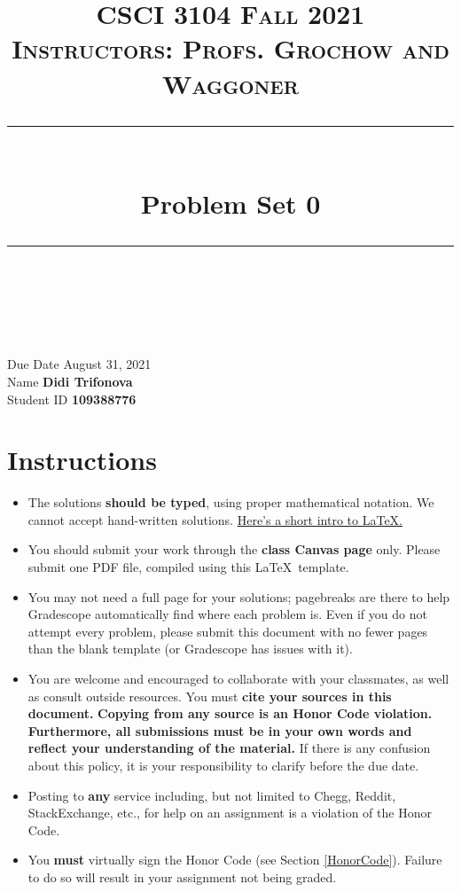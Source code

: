 \documentclass[11pt]{article}
\title{
\normalfont \normalsize 
\textsc{CSCI 3104 Fall 2021 \\ 
Instructors: Profs. Grochow and Waggoner} \\
[10pt] 
\rule{\linewidth}{0.5pt} \\[6pt] 
\huge Problem Set 0 \\
\rule{\linewidth}{2pt}  \\[10pt]
}
\date{}
\theoremstyle{definition}
\theoremstyle{definition}
\theoremstyle{definition}
\begin{document}
\maketitle


\noindent
Due Date \dotfill August 31, 2021 \\
Name \dotfill \textbf{Didi Trifonova} \\
Student ID \dotfill \textbf{109388776} 

\tableofcontents

\section{Instructions}
 \begin{itemize}
	\item The solutions \textbf{should be typed}, using proper mathematical notation. We cannot accept hand-written solutions. \href{http://ece.uprm.edu/~caceros/latex/introduction.pdf}{Here's a short intro to \LaTeX.}
	\item You should submit your work through the \textbf{class Canvas page} only. Please submit one PDF file, compiled using this \LaTeX \ template.
	\item You may not need a full page for your solutions; pagebreaks are there to help Gradescope automatically find where each problem is. Even if you do not attempt every problem, please submit this document with no fewer pages than the blank template (or Gradescope has issues with it).

	\item You are welcome and encouraged to collaborate with your classmates, as well as consult outside resources. You must \textbf{cite your sources in this document.} \textbf{Copying from any source is an Honor Code violation. Furthermore, all submissions must be in your own words and reflect your understanding of the material.} If there is any confusion about this policy, it is your responsibility to clarify before the due date. 

	\item Posting to \textbf{any} service including, but not limited to Chegg, Reddit, StackExchange, etc., for help on an assignment is a violation of the Honor Code.

	\item You \textbf{must} virtually sign the Honor Code (see Section \ref{HonorCode}). Failure to do so will result in your assignment not being graded.
\end{itemize}
\end{document}
